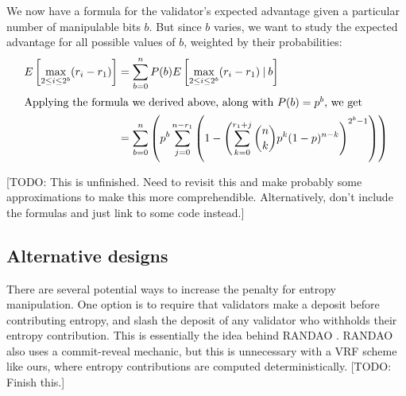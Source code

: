 We now have a formula for the validator's expected advantage given a particular number of manipulable bits $b$. But since $b$ varies, we want to study the expected advantage for all possible values of $b$, weighted by their probabilities:
\begin{align*}
E\left[ \max_{2 \le i \le 2^b}(r_i - r_1) \right] &= \sum_{b=0}^{n} P(b) E\left[ \max_{2 \le i \le 2^b}(r_i - r_1) \mathbin{\vert} b \right] \\
\intertext{Applying the formula we derived above, along with $P(b) = p^b$, we get}
&= \sum_{b=0}^{n} \left( p^b \sum_{j=0}^{n - r_1} \left( 1 - \left( \sum_{k=0}^{r_1 + j} \binom{n}{k} p^k (1-p)^{n-k} \right)^{2^b - 1} \right) \right)
\end{align*}

[TODO: This is unfinished. Need to revisit this and make probably some approximations to make this more comprehendible. Alternatively, don't include the formulas and just link to some code instead.]

\subsection{Alternative designs}

There are several potential ways to increase the penalty for entropy manipulation. One option is to require that validators make a deposit before contributing entropy, and slash the deposit of any validator who withholds their entropy contribution. This is essentially the idea behind RANDAO \cite{randao}. RANDAO also uses a commit-reveal mechanic, but this is unnecessary with a VRF scheme like ours, where entropy contributions are computed deterministically. [TODO: Finish this.]

